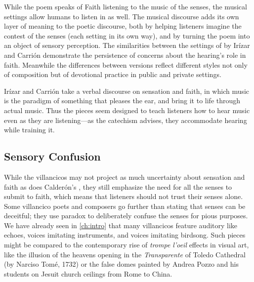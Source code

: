 While the poem speaks of Faith listening to the music of the senses, the musical
settings allow humans to listen in as well.
The musical discourse adds its own layer of meaning to the poetic discourse,
both by helping listeners imagine the contest of the senses (each setting in its
own way), and by turning the poem into an object of sensory perception.
The similarities between the settings of  by Irízar and
Carrión demonstrate the persistence of concerns about the hearing's role in
faith.
Meanwhile the differences between versions reflect different styles not only of
composition but of devotional practice in public and private settings.

Irízar and Carrión take a verbal discourse on sensation and faith, in which
music is the paradigm of something that pleases the ear, and bring it to life
through actual music.
Thus the pieces seem designed to teach listeners how to hear music even as they
are listening---as the catechism advises, they accommodate hearing while
training it.


\subsection{Sensory Confusion}

While the  villancicos may not project as much
uncertainty about sensation and faith as does Calderón's , they still emphasize the need for all the senses to submit
to faith, which means that listeners should not trust their senses alone.
Some villancico poets and composers go further than stating that senses can be
deceitful; they use paradox to deliberately confuse the senses for pious
purposes.
We have already seen in \cref{ch:intro} that many villancicos feature
auditory  like echoes, voices imitating instruments, and
voices imitating birdsong.
Such pieces might be compared to the contemporary rise of \emph{trompe l'oeil}
effects in visual art, like the illusion of the heavens opening in the
\emph{Transparente} of Toledo Cathedral (by Narciso Tomé, 1732) or the false
domes painted by Andrea Pozzo and his students on Jesuit church ceilings from
Rome to China.%
    \Autocites
    []{GroveArt}
    [110]{Bailey:Art}

